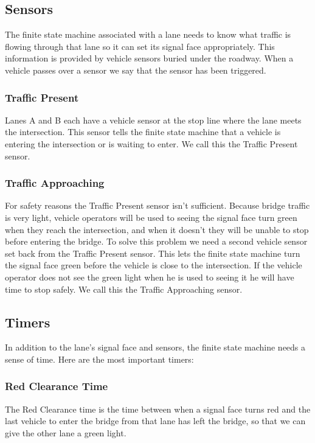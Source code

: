 \documentclass[letterpaper,twoside]{article}
\begin{document}
\subsection{Sensors}

The finite state machine associated with a lane needs to know
what traffic is flowing through that lane so it can set its
signal face appropriately.  This information is provided
by vehicle sensors buried under the roadway.
When a vehicle passes over a sensor we say that the sensor
has been triggered.

\subsubsection{Traffic Present}

Lanes A and B each have a vehicle sensor at the stop line where the lane
meets the intersection.  This sensor tells the finite state machine
that a vehicle is entering the intersection or is waiting to enter.
We call this the Traffic Present sensor.

\subsubsection{Traffic Approaching}

For safety reasons the Traffic Present sensor isn't sufficient.
Because bridge traffic is very light, vehicle operators will be
used to seeing the signal face turn green when they reach
the intersection, and when it doesn't they will be unable to stop
before entering the bridge.  To solve this problem we need a
second vehicle sensor set back from the Traffic Present sensor.
This lets the finite state machine turn the signal face green
before the vehicle is
close to the intersection.  If the vehicle operator does not
see the green light when he is used to seeing it he will have
time to stop safely.  We call this the Traffic Approaching sensor.

\subsection{Timers}

In addition to the lane's signal face and sensors, the
finite state machine needs a sense of time.  Here are the most
important timers:

\subsubsection{Red Clearance Time}
The Red Clearance time is the time between when a signal face turns red
and the last vehicle to enter the bridge from that lane has left the
bridge, so that we can give the other lane a green light.
\end{document}
